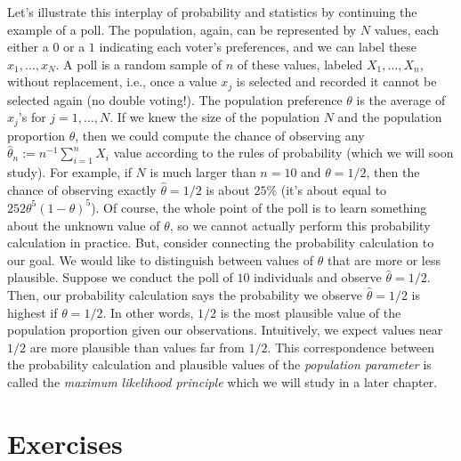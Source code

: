 \documentclass[]{book}
\begin{document}
Let's illustrate this interplay of probability and statistics by
continuing the example of a poll. The population, again, can be
represented by \(N\) values, each either a \(0\) or a \(1\) indicating
each voter's preferences, and we can label these \(x_1, \ldots, x_N\). A
poll is a random sample of \(n\) of these values, labeled
\(X_1, \ldots,X_n\), without replacement, i.e., once a value \(x_j\) is
selected and recorded it cannot be selected again (no double voting!).
The population preference \(\theta\) is the average of \(x_j\)'s for
\(j=1, \ldots, N\). If we knew the size of the population \(N\) and the
population proportion \(\theta\), then we could compute the chance of
observing any \(\hat\theta_n := n^{-1}\sum_{i=1}^n X_i\) value according
to the rules of probability (which we will soon study). For example, if
\(N\) is much larger than \(n = 10\) and \(\theta = 1/2\), then the
chance of observing exactly \(\hat\theta = 1/2\) is about \(25\%\) (it's
about equal to \(252\theta^5(1-\theta)^5\)). Of course, the whole point
of the poll is to learn something about the unknown value of \(\theta\),
so we cannot actually perform this probability calculation in practice.
But, consider connecting the probability calculation to our goal. We
would like to distinguish between values of \(\theta\) that are more or
less plausible. Suppose we conduct the poll of \(10\) individuals and
observe \(\hat\theta = 1/2\). Then, our probability calculation says the
probability we observe \(\hat\theta = 1/2\) is highest if
\(\theta = 1/2\). In other words, \(1/2\) is the most plausible value of
the population proportion given our observations. Intuitively, we expect
values near \(1/2\) are more plausible than values far from \(1/2\).
This correspondence between the probability calculation and plausible
values of the \emph{population parameter} is called the \emph{maximum
likelihood principle} which we will study in a later chapter.

\section{Exercises}\label{exercises}
\end{document}
